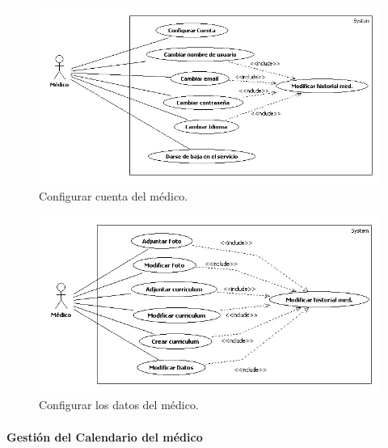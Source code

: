 \documentclass[a4paper,oneside,11pt]{book}
\begin{document}
				\begin{figure}[H]
				  \centering
				    \includegraphics[width=15cm]{img/jpg/casos_uso/Configurar_Cuenta_Medico.jpg}
				  \caption{Configurar cuenta del médico.}
				  \label{fig:config_med_cuenta}
				\end{figure}
				
				\bigskip
				
				\begin{figure}[H]
				  \centering
				    \includegraphics[width=15cm]{img/jpg/casos_uso/Configurar_Datos_Medico.jpg}
				  \caption{Configurar los datos del médico.}
				  \label{fig:config_med_datos}
				\end{figure}
		
			\bigskip
			\bigskip
			\paragraph{Gestión del Calendario del médico} %
			\label{par:gestion_del_calendario_del_medico}
			
\end{document}
